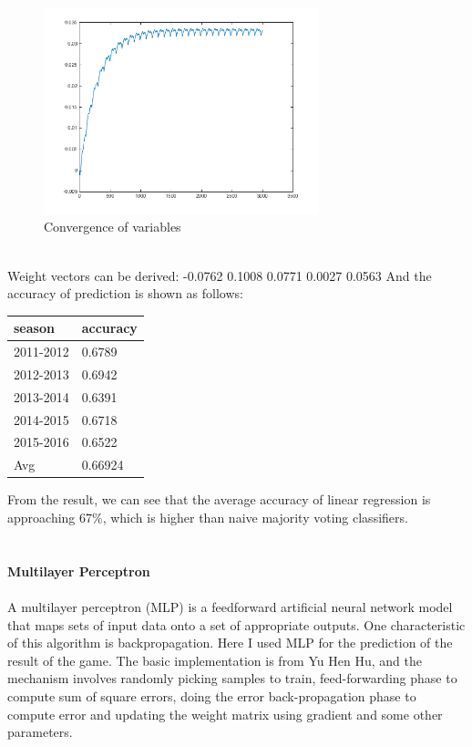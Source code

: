 \documentclass{article}
\begin{document}
\begin{figure}[htbp]
 \centering
 \includegraphics[width=8cm, height=6cm]{converged}
  \caption{Convergence of variables}
\end{figure}
\\
Weight vectors can be derived:
-0.0762    0.1008    0.0771    0.0027    0.0563
And the accuracy of prediction is shown as follows:
\begin{center}
\begin{tabular}{|l|l|}
\hline
season    & accuracy           \\ \hline
2011-2012 & 0.6789 \\ \hline
2012-2013 & 0.6942 \\ \hline
2013-2014 & 0.6391 \\ \hline
2014-2015 & 0.6718  \\ \hline
2015-2016 & 0.6522 \\ \hline
Avg & 0.66924 \\ \hline
\end{tabular}
\end{center}
From the result, we can see that the average accuracy of linear regression is approaching 67\%, which is higher than naive majority voting classifiers.
\\
\\
\\
\textbf{Multilayer Perceptron}
\\
\\
A multilayer perceptron (MLP) is a feedforward artificial neural network model that maps sets of input data onto a set of appropriate outputs. One characteristic of this algorithm is backpropagation. Here I used MLP for the prediction of the result of the game. 
The basic implementation is from Yu Hen Hu, and the mechanism involves randomly picking samples to train, feed-forwarding phase to compute sum of square errors, doing the error back-propagation phase to compute error and updating the weight matrix using gradient and some other parameters.
\end{document}

